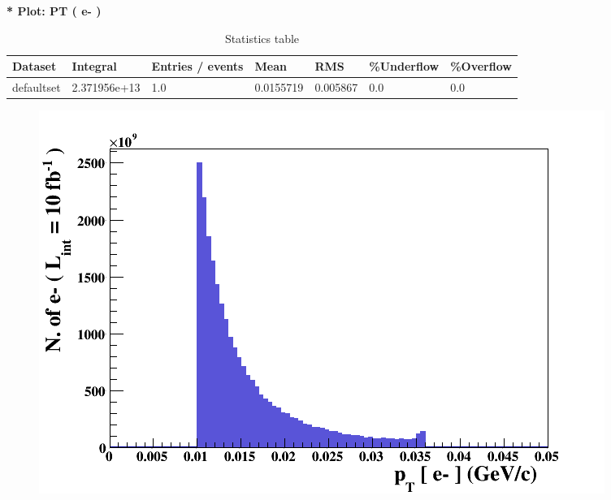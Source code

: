 \documentclass[a4paper, 11pt]{article}
\begin{document}
   \textbf{   * Plot: PT ( e- ) }
\textbf{ }\begin{table}[!h]
  \begin{center}
    \caption{ Statistics table}
    \begin{tabular}{|m{17.0mm}|m{27.0mm}|m{23.0mm}|m{18.0mm}|m{18.0mm}|m{14.0mm}|m{14.0mm}|}
      \hline
      \cellcolor{yellow}         Dataset& \cellcolor{yellow}         Integral& \cellcolor{yellow}         Entries /\- events& \cellcolor{yellow}         Mean& \cellcolor{yellow}         RMS& \cellcolor{yellow}         \%Underflow& \cellcolor{yellow}         \%Overflow\\
      \hline
      \cellcolor{white}         defaultset& \cellcolor{white}         2.371956e+13& \cellcolor{white}         1.0& \cellcolor{white}         0.0155719& \cellcolor{white}         0.005867& \cellcolor{green}         0.0& \cellcolor{green}         0.0\\
\hline
    \end{tabular}
  \end{center}
\end{table}

\begin{figure}[!h]
  \begin{center}
    \includegraphics[scale=0.6]{selection_2.png}\\
\caption{}
  \end{center}
\end{figure}
\newpage
   
\end{document}
